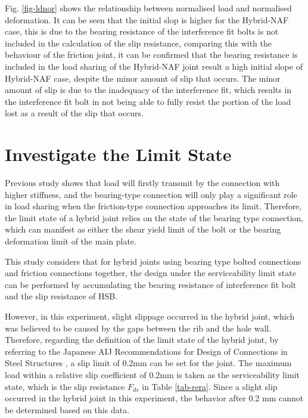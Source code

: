 Fig. \ref{fig-ldnor} shows the relationship between normalised load and normalised deformation. It can be seen that the initial slop is higher for the Hybrid-NAF case, this is due to the bearing resistance of the interference fit bolts is not included in the calculation of the slip resistance, comparing this with the behaviour of the friction joint, it can be confirmed that the bearing resistance is included in the load sharing of the Hybrid-NAF joint result a high initial slope of Hybrid-NAF case, despite the minor amount of slip that occurs. The minor amount of slip is due to the inadequacy of the interference fit,  which results in the interference fit bolt in not being able to fully resist the portion of the load lost as a result of the slip that occurs. 


\section{Investigate the Limit State}

Previous study \cite{fisher1965behavior} shows that load will firstly transmit by the connection with higher stiffness, and the bearing-type connection will only play a significant role in load sharing when the friction-type connection approaches its limit. Therefore, the limit state of a hybrid joint relies on the state of the bearing type connection, which can manifest as either the shear yield limit of the bolt or the bearing deformation limit of the main plate.

This study considers that for hybrid joints using bearing type bolted connections and friction connections together, the design under the serviceability limit state can be performed by accumulating the bearing resistance of interference fit bolt and the slip resistance of HSB.

However, in this experiment, slight slippage occurred in the hybrid joint, which was believed to be caused by the gaps between the rib and the hole wall. Therefore, regarding the definition of the limit state of the hybrid joint, by referring to the Japanese AIJ Recommendations for Design of Connections in Steel Structures \cite{AIJ2012AIJStructures}, a slip limit of 0.2mm can be set for the joint. The maximum load within a relative slip coefficient of 0.2mm is taken as the serviceability limit state, which is the slip resistance $F_{ds}$ in Table \ref{tab-rera}. Since a slight slip occurred in the hybrid joint in this experiment, the behavior after 0.2 mm cannot be determined based on this data. 

